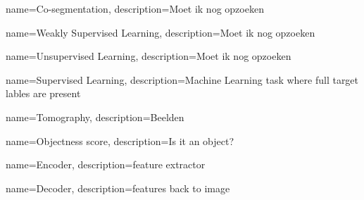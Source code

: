 

{
        name={Co-segmentation},
        description={Moet ik nog opzoeken}
}

{
        name={Weakly Supervised Learning},
        description={Moet ik nog opzoeken}
}

{
        name={Unsupervised Learning},
        description={Moet ik nog opzoeken}
}

{
        name={Supervised Learning},
        description={Machine Learning task where full target lables are present}
}

{
        name={Tomography},
        description={Beelden}
}

{
        name={Objectness score},
        description={Is it an object?}
}

{
        name={Encoder},
        description={feature extractor}
}

{
        name={Decoder},
        description={features back to image}
}

